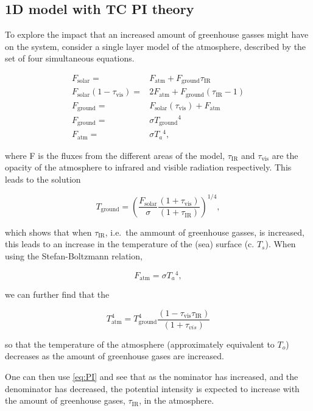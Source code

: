 \subsection{1D model with TC PI theory}
\label{sec:1d-hurr}
To explore the impact that an increased amount of greenhouse gasses might have
on the system, consider a single layer model of the atmosphere, described by the
set of four simultaneous equations.

\begin{eqnarray}
F_{\mathrm{solar}} =& F_{\mathrm{atm}} + F_{\mathrm{ground}}\tau_{\mathrm{IR}}\\
F_{\mathrm{solar}}(1-\tau_{\mathrm{vis}}) =& 2F_{\mathrm{atm}} + F_{\mathrm{ground}}(\tau_{\mathrm{IR}}-1)\\
F_{\mathrm{ground}} = & F_{\mathrm{solar}}(\tau_{\mathrm{vis}}) +F_{\mathrm{atm}}  \\
F_{\mathrm{ground}} = & \sigma T_{\mathrm{ground}}{}^4 \\
F_{\mathrm{atm}} = & \sigma T_a{}^{4},
\end{eqnarray}

where F is the fluxes from the different areas of the model,
$ \tau_{\mathrm{IR}}$ and $\tau_{\mathrm{vis}}$ are the opacity of the atmosphere
to infrared and visible radiation respectively.
This leads to the solution

\begin{equation}
T_{\mathrm{ground}} = \left( \frac{F_{\mathrm{solar}}}{\sigma}\frac{(1+\tau_{\mathrm{vis}})}{(1+\tau_{\mathrm{IR}})}\right)^{1/4},
\end{equation}

which shows that when $\tau_{\mathrm{IR}}$, i.e.~the ammount of greenhouse gasses,
is increased, this leads to an increase in the temperature of the (sea) surface (c. $T_s$).
When using the Stefan-Boltzmann relation,

\begin{equation}
F_{\mathrm{atm}} = \sigma T_a{}^{4},
\end{equation}

we can further find that the

\begin{equation}
T_{\mathrm{atm}}^{4}=T_{\mathrm{ground}}^4\frac{(1-\tau_{\mathrm{vis}}\tau_{\mathrm{IR}})}{(1+\tau_{vis})}
\end{equation}

so that the temperature of the atmosphere (approximately equivalent to $T_{o}$)
decreases as the amount of greenhouse gases are increased.


One can then use \ref{eq:PI} and see that as the nominator has increased, and the
denominator has decreased, the potential intensity is expected to increase with the
amount of greenhouse gases, $\tau_{\mathrm{IR}}$, in the atmosphere.
